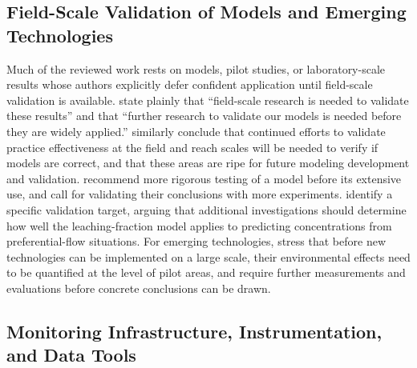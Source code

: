 \subsection{Field-Scale Validation of Models and Emerging Technologies}

Much of the reviewed work rests on models, pilot studies, or laboratory-scale results whose authors explicitly defer confident application until field-scale validation is available. \textcite{Mitchell2025} state plainly that ``field-scale research is needed to validate these results'' and that ``further research to validate our models is needed before they are widely applied.'' \textcite{Kalcic2018} similarly conclude that continued efforts to validate practice effectiveness at the field and reach scales will be needed to verify if models are correct, and that these areas are ripe for future modeling development and validation. \textcite{Garmdareh2018} recommend more rigorous testing of a model before its extensive use, and \textcite{Yu2016} call for validating their conclusions with more experiments. \textcite{SHALIT1995} identify a specific validation target, arguing that additional investigations should determine how well the leaching-fraction model applies to predicting concentrations from preferential-flow situations. For emerging technologies, \textcite{DarziNaftchali2018b} stress that before new technologies can be implemented on a large scale, their environmental effects need to be quantified at the level of pilot areas, and \textcite{GUPTA1993} require further measurements and evaluations before concrete conclusions can be drawn.

\subsection{Monitoring Infrastructure, Instrumentation, and Data Tools}

